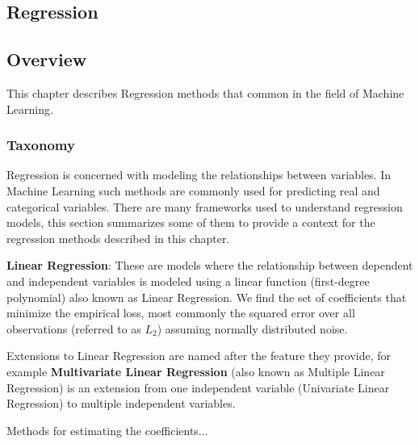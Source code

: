 

\renewcommand{\bibsection}{\subsection{\bibname}}
\begin{bibunit}

\chapter{Regression}
\label{ch:regression}

\section{Overview}
This chapter describes Regression methods that common in the field of Machine Learning.

\subsection{Taxonomy}
Regression is concerned with modeling the relationships between variables. In Machine Learning such methods are commonly used for predicting real and categorical variables. There are many frameworks used to understand regression models, this section summarizes some of them to provide a context for the regression methods described in this chapter.

\textbf{Linear Regression}: These are models where the relationship between dependent and independent variables is modeled using a linear function (first-degree polynomial) also known as Linear Regression. We find the set of coefficients that minimize the empirical loss, most commonly the squared error over all observations (referred to as $L_2$) assuming normally distributed noise. 

Extensions to Linear Regression are named after the feature they provide, for example \textbf{Multivariate Linear Regression} (also known as Multiple Linear Regression) is an extension from one independent variable (Univariate Linear Regression) to multiple independent variables.

Methods for estimating the coefficients...


\end{bibunit}
